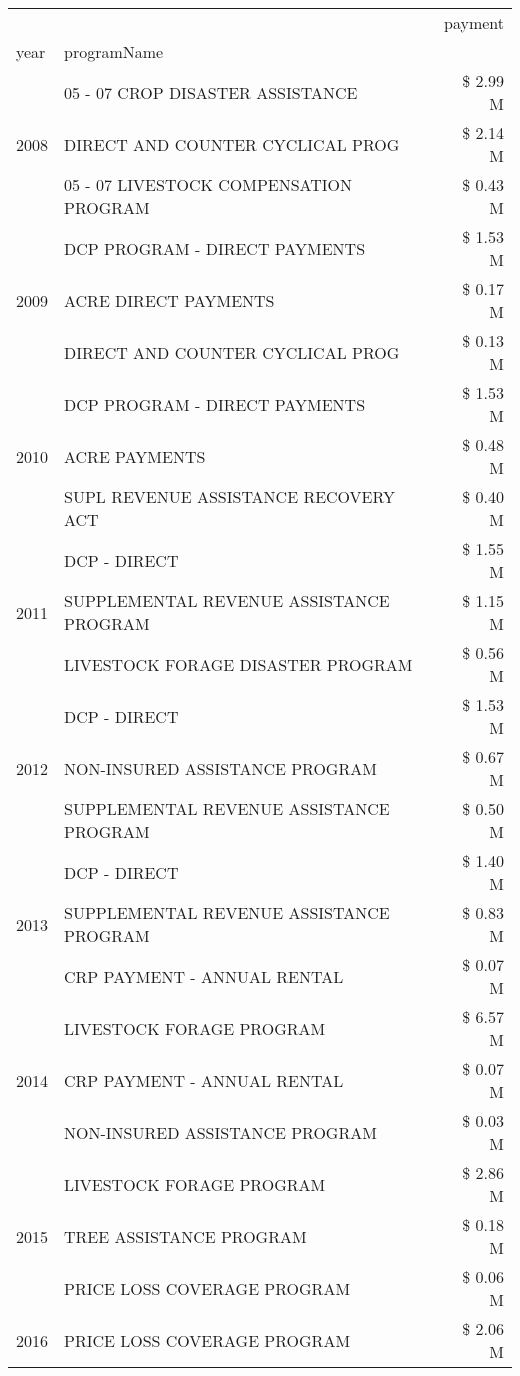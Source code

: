 \begin{tabular}{llr}
\toprule
 &  & payment \\
year & programName &  \\
\midrule
\multirow[t]{3}{*}{2008} & 05 - 07 CROP DISASTER ASSISTANCE & \$ 2.99 M \\
 & DIRECT AND COUNTER CYCLICAL PROG & \$ 2.14 M \\
 & 05 - 07 LIVESTOCK COMPENSATION PROGRAM & \$ 0.43 M \\
\cline{1-3}
\multirow[t]{3}{*}{2009} & DCP PROGRAM - DIRECT PAYMENTS & \$ 1.53 M \\
 & ACRE DIRECT PAYMENTS & \$ 0.17 M \\
 & DIRECT AND COUNTER CYCLICAL PROG & \$ 0.13 M \\
\cline{1-3}
\multirow[t]{3}{*}{2010} & DCP PROGRAM - DIRECT PAYMENTS & \$ 1.53 M \\
 & ACRE PAYMENTS & \$ 0.48 M \\
 & SUPL REVENUE ASSISTANCE RECOVERY ACT & \$ 0.40 M \\
\cline{1-3}
\multirow[t]{3}{*}{2011} & DCP - DIRECT & \$ 1.55 M \\
 & SUPPLEMENTAL REVENUE ASSISTANCE PROGRAM & \$ 1.15 M \\
 & LIVESTOCK FORAGE DISASTER PROGRAM & \$ 0.56 M \\
\cline{1-3}
\multirow[t]{3}{*}{2012} & DCP - DIRECT & \$ 1.53 M \\
 & NON-INSURED ASSISTANCE PROGRAM & \$ 0.67 M \\
 & SUPPLEMENTAL REVENUE ASSISTANCE PROGRAM & \$ 0.50 M \\
\cline{1-3}
\multirow[t]{3}{*}{2013} & DCP - DIRECT & \$ 1.40 M \\
 & SUPPLEMENTAL REVENUE ASSISTANCE PROGRAM & \$ 0.83 M \\
 & CRP PAYMENT - ANNUAL RENTAL & \$ 0.07 M \\
\cline{1-3}
\multirow[t]{3}{*}{2014} & LIVESTOCK FORAGE PROGRAM & \$ 6.57 M \\
 & CRP PAYMENT - ANNUAL RENTAL & \$ 0.07 M \\
 & NON-INSURED ASSISTANCE PROGRAM & \$ 0.03 M \\
\cline{1-3}
\multirow[t]{3}{*}{2015} & LIVESTOCK FORAGE PROGRAM & \$ 2.86 M \\
 & TREE ASSISTANCE PROGRAM & \$ 0.18 M \\
 & PRICE LOSS COVERAGE PROGRAM & \$ 0.06 M \\
\cline{1-3}
\multirow[t]{3}{*}{2016} & PRICE LOSS COVERAGE PROGRAM & \$ 2.06 M \\

\end{tabular}
